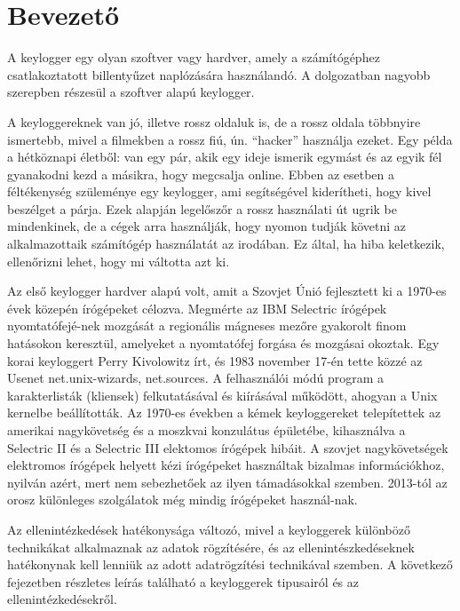 \documentclass[a4paper, 11pt]{article}
\begin{document}
\renewcommand{\listfigurename}{Ábrák jegyzéke}
\listoffigures
\thispagestyle{empty}
\cleardoublepage

\renewcommand{\listtablename}{Táblázatok jegyzéke}
\listoftables
\thispagestyle{empty}
\cleardoublepage

\setcounter{page}{1}
\setlength{\parindent}{0.5cm}

\section{Bevezető}\label{sec:intro}
A keylogger egy olyan szoftver vagy hardver, amely a számítógéphez csatlakoztatott billentyűzet naplózására használandó. A dolgozatban nagyobb szerepben részesül a szoftver alapú keylogger.

A keyloggereknek van jó, illetve rossz oldaluk is, de a rossz oldala többnyire ismertebb, mivel a filmekben a rossz fiú, ún. ``hacker'' használja ezeket. Egy példa a hétköznapi életből: van egy pár, akik egy ideje ismerik egymást és az egyik fél gyanakodni kezd a másikra, hogy megcsalja online. Ebben az esetben a féltékenység szüleménye egy keylogger, ami segítségével kiderítheti, hogy kivel beszélget a párja. Ezek alapján legelőszőr a rossz használati út ugrik be mindenkinek, de a cégek arra használják, hogy nyomon tudják követni az alkalmazottaik számítógép használatát az irodában. Ez által, ha hiba keletkezik, ellenőrizni lehet, hogy mi váltotta azt ki.

Az első keylogger hardver alapú volt, amit a Szovjet Únió fejlesztett ki a 1970-es évek közepén írógépeket célozva. Megmérte az IBM Selectric írógépek nyomtatófejé-nek mozgását a regionális mágneses mezőre gyakorolt finom hatásokon keresztül, amelyeket a nyomtatófej forgása és mozgásai okoztak. Egy korai keyloggert Perry Kivolowitz írt, és 1983 november 17-én tette közzé az Usenet net.unix-wizards, net.sources. A felhasználói módú program a karakterlisták (kliensek) felkutatásával és kiírásával működött, ahogyan a Unix kernelbe beállították. Az 1970-es években a kémek keyloggereket telepítettek az amerikai nagykövetség és a moszkvai konzulátus épületébe, kihasználva a Selectric II és a Selectric III elektomos írógépek hibáit. A szovjet nagykövetségek elektromos írógépek helyett kézi írógépeket használtak bizalmas információkhoz, nyilván azért, mert nem sebezhetőek az ilyen támadásokkal szemben. 2013-tól az orosz különleges szolgálatok még mindig írógépeket használ-nak.

Az ellenintézkedések hatékonysága változó, mivel a keyloggerek különböző technikákat alkalmaznak az adatok rögzítésére, és az ellenintészkedéseknek hatékonynak kell lenniük az adott adatrögzítési technikával szemben. %
A következő fejezetben részletes leírás található a keyloggerek tipusairól és az ellenintézkedésekről.
\end{document}
